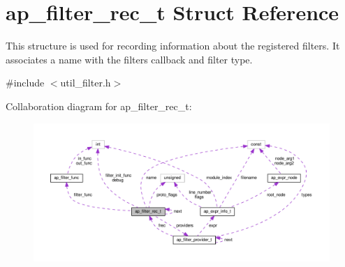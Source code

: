 \hypertarget{structap__filter__rec__t}{}\section{ap\+\_\+filter\+\_\+rec\+\_\+t Struct Reference}
\label{structap__filter__rec__t}


This structure is used for recording information about the registered filters. It associates a name with the filter\textquotesingle{}s callback and filter type.  




{\ttfamily \#include $<$util\+\_\+filter.\+h$>$}



Collaboration diagram for ap\+\_\+filter\+\_\+rec\+\_\+t\+:
\nopagebreak
\begin{figure}[H]
\begin{center}
\leavevmode
\includegraphics[width=350pt]{structap__filter__rec__t__coll__graph}
\end{center}
\end{figure}
